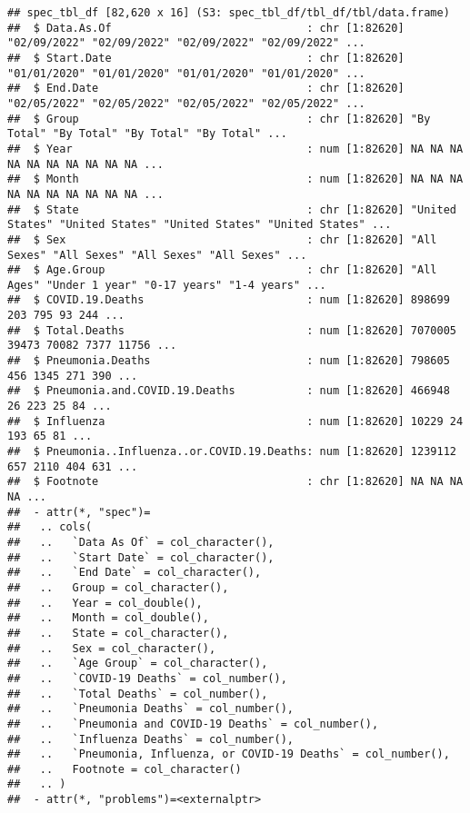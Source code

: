 \documentclass[
]{article}
\begin{document}
\begin{verbatim}
## spec_tbl_df [82,620 x 16] (S3: spec_tbl_df/tbl_df/tbl/data.frame)
##  $ Data.As.Of                              : chr [1:82620] "02/09/2022" "02/09/2022" "02/09/2022" "02/09/2022" ...
##  $ Start.Date                              : chr [1:82620] "01/01/2020" "01/01/2020" "01/01/2020" "01/01/2020" ...
##  $ End.Date                                : chr [1:82620] "02/05/2022" "02/05/2022" "02/05/2022" "02/05/2022" ...
##  $ Group                                   : chr [1:82620] "By Total" "By Total" "By Total" "By Total" ...
##  $ Year                                    : num [1:82620] NA NA NA NA NA NA NA NA NA NA ...
##  $ Month                                   : num [1:82620] NA NA NA NA NA NA NA NA NA NA ...
##  $ State                                   : chr [1:82620] "United States" "United States" "United States" "United States" ...
##  $ Sex                                     : chr [1:82620] "All Sexes" "All Sexes" "All Sexes" "All Sexes" ...
##  $ Age.Group                               : chr [1:82620] "All Ages" "Under 1 year" "0-17 years" "1-4 years" ...
##  $ COVID.19.Deaths                         : num [1:82620] 898699 203 795 93 244 ...
##  $ Total.Deaths                            : num [1:82620] 7070005 39473 70082 7377 11756 ...
##  $ Pneumonia.Deaths                        : num [1:82620] 798605 456 1345 271 390 ...
##  $ Pneumonia.and.COVID.19.Deaths           : num [1:82620] 466948 26 223 25 84 ...
##  $ Influenza                               : num [1:82620] 10229 24 193 65 81 ...
##  $ Pneumonia..Influenza..or.COVID.19.Deaths: num [1:82620] 1239112 657 2110 404 631 ...
##  $ Footnote                                : chr [1:82620] NA NA NA NA ...
##  - attr(*, "spec")=
##   .. cols(
##   ..   `Data As Of` = col_character(),
##   ..   `Start Date` = col_character(),
##   ..   `End Date` = col_character(),
##   ..   Group = col_character(),
##   ..   Year = col_double(),
##   ..   Month = col_double(),
##   ..   State = col_character(),
##   ..   Sex = col_character(),
##   ..   `Age Group` = col_character(),
##   ..   `COVID-19 Deaths` = col_number(),
##   ..   `Total Deaths` = col_number(),
##   ..   `Pneumonia Deaths` = col_number(),
##   ..   `Pneumonia and COVID-19 Deaths` = col_number(),
##   ..   `Influenza Deaths` = col_number(),
##   ..   `Pneumonia, Influenza, or COVID-19 Deaths` = col_number(),
##   ..   Footnote = col_character()
##   .. )
##  - attr(*, "problems")=<externalptr>
\end{verbatim}
\end{document}
